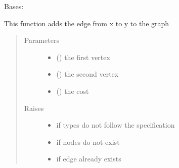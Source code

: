 \documentclass[letterpaper,10pt,english]{sphinxmanual}
\begin{document}
\begin{fulllineitems}
\label{\detokenize{UndirectedGraph:UndirectedGraph.UndirectedGraph}}
Bases: 

\begin{fulllineitems}
\label{\detokenize{UndirectedGraph:UndirectedGraph.UndirectedGraph.add_edge}}
This function adds the edge from x to y to the graph
\begin{quote}\begin{description}
\item[{Parameters}] \leavevmode\begin{itemize}
\item {} 
 () \textendash{} the first vertex

\item {} 
 () \textendash{} the second vertex

\item {} 
 () \textendash{} the cost

\end{itemize}

\item[{Raises}] \leavevmode\begin{itemize}
\item {} 
 \textendash{} if types do not follow the specification

\item {} 
 \textendash{} if nodes do not exist

\item {} 
 \textendash{} if edge already exists

\end{itemize}


\end{description}
\end{quote}
\end{fulllineitems}
\end{fulllineitems}
\end{document}
